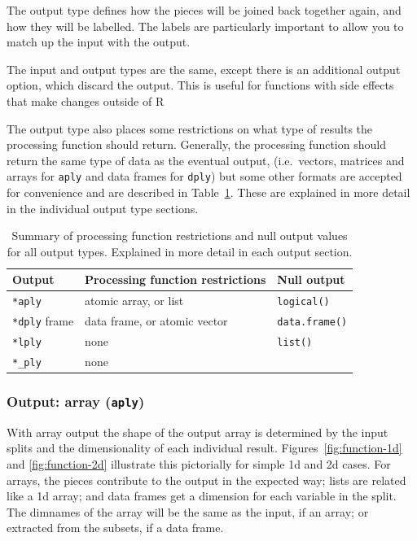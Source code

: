 \documentclass{scrartcl}
\newcommand{\code}[1]{\lstinline!#1!}
\newcommand{\f}[1]{\lstinline!#1()!}
\begin{document}
The output type defines how the pieces will be joined back together again, and how they will be labelled.  The labels are particularly important to allow you to match up the input with the output.

The input and output types are the same, except there is an additional output option, which discard the output.  This is useful for functions with side effects that make changes outside of R

The output type also places some restrictions on what type of results the processing function should return.  Generally, the processing function should return the same type of data as the eventual output, (i.e.\ vectors, matrices and arrays for {\tt *aply} and data frames for {\tt *dply}) but some other formats are accepted for convenience and are described in Table~\ref{tbl:restrictions}.  These are explained in more detail in the individual output type sections.

\begin{table}
  \begin{center}
  \begin{tabular}{lll}
    \toprule
    Output & Processing function restrictions & Null output \\
    \midrule
     \code{*aply} & atomic array, or list & \f{logical} \\
     \code{*dply} frame  & data frame, or atomic vector & \f{data.frame}\\
     \code{*lply} & none & \f{list} \\
     \code{*_ply} & none &  \\
     \bottomrule  
  \end{tabular}
  \end{center}
  \caption{Summary of processing function restrictions and null output values for all output types.  Explained in more detail in each output section. }
  \label{tbl:restrictions}
\end{table}


\subsubsection{Output: array ({\tt *aply})}

With array output the shape of the output array is determined by the input splits and the dimensionality of each individual result. Figures~\ref{fig:function-1d} and \ref{fig:function-2d} illustrate this pictorially for simple 1d and 2d cases.  For arrays, the pieces contribute to the output in the expected way; lists are related like a 1d array; and data frames get a dimension for each variable in the split.  The dimnames of the array will be the same as the input, if an array; or extracted from the subsets, if a data frame.
\end{document}
